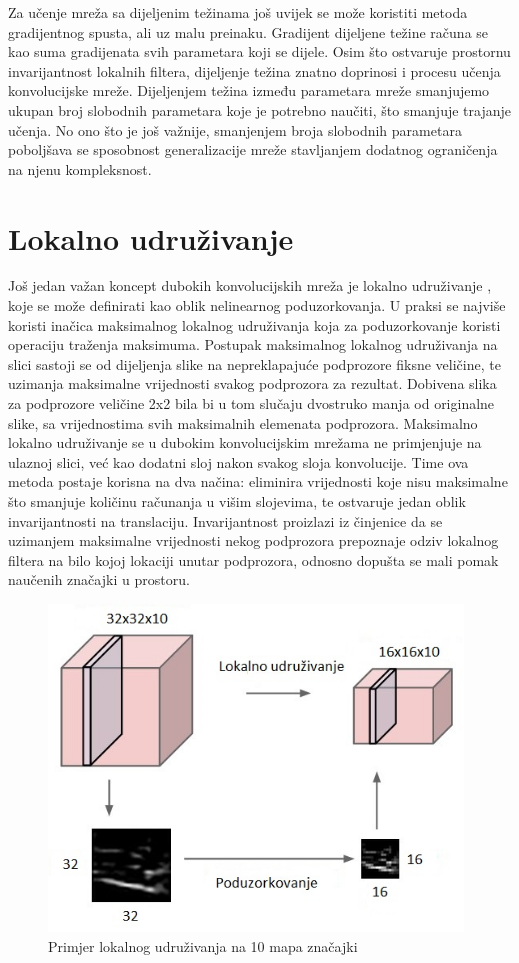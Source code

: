 \documentclass[lmodern, utf8, diplomski, numeric]{fer}
\begin{document}
Za učenje mreža sa dijeljenim težinama još uvijek se može koristiti metoda gradijentnog spusta, ali uz malu preinaku. Gradijent dijeljene težine računa se kao suma gradijenata svih parametara koji se dijele. 
Osim što ostvaruje prostornu invarijantnost lokalnih filtera, dijeljenje težina znatno doprinosi i procesu učenja konvolucijske mreže. Dijeljenjem težina između parametara  mreže smanjujemo ukupan broj slobodnih parametara koje je potrebno naučiti, što smanjuje trajanje učenja. No ono što je još važnije, smanjenjem broja slobodnih parametara poboljšava se sposobnost generalizacije mreže stavljanjem dodatnog ograničenja na njenu kompleksnost.  

\section{Lokalno udruživanje}

Još jedan važan koncept dubokih konvolucijskih mreža je lokalno udruživanje , koje se može definirati kao oblik nelinearnog poduzorkovanja. U praksi se najviše koristi inačica maksimalnog lokalnog udruživanja  koja za poduzorkovanje koristi operaciju traženja maksimuma. 
Postupak maksimalnog lokalnog udruživanja na slici sastoji se od dijeljenja slike na nepreklapajuće podprozore fiksne veličine, te uzimanja maksimalne vrijednosti svakog podprozora za rezultat. Dobivena slika za podprozore veličine 2x2 bila bi u tom slučaju dvostruko manja od originalne slike, sa vrijednostima svih maksimalnih elemenata podprozora. 
Maksimalno lokalno udruživanje se u dubokim konvolucijskim mrežama ne primjenjuje na ulaznoj slici, već kao dodatni sloj nakon svakog sloja konvolucije. Time ova metoda postaje korisna na dva načina: eliminira vrijednosti koje nisu maksimalne što smanjuje količinu računanja u višim slojevima, te ostvaruje jedan oblik invarijantnosti na translaciju. Invarijantnost proizlazi iz činjenice da se uzimanjem maksimalne vrijednosti nekog podprozora prepoznaje odziv lokalnog filtera na bilo kojoj lokaciji unutar podprozora, odnosno dopušta se mali pomak naučenih značajki u prostoru.


\begin{figure}[ht!]
\centering
\includegraphics[width=11cm]{slike/max_pooling.jpeg}
\caption{Primjer lokalnog udruživanja na 10 mapa značajki}
\end{figure}
\end{document}
